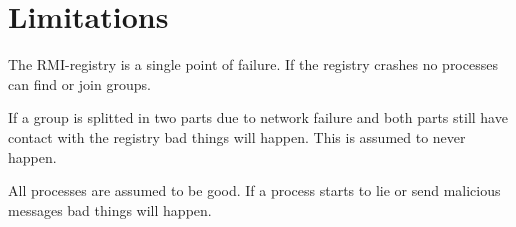 \documentclass[11pt,swedish]{article}
\begin{document}
\section{Limitations}
The RMI-registry is a single point of failure. If the registry crashes no processes can find or join groups. 

If a group is splitted in two parts due to network failure and both parts still have contact  with the registry bad things will happen. This is assumed to never happen.

All processes are assumed to be good. If a process starts to lie or send malicious messages bad things will happen.
\end{document}
